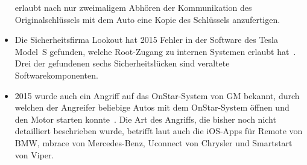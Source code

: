 \begin{itemize}
          erlaubt nach nur zweimaligem Abhören der Kommunikation des
          Originalschlüssels mit dem Auto eine Kopie des Schlüssels
          anzufertigen.
    \item Die Sicherheitsfirma Lookout hat 2015 Fehler in der Software des
          Tesla Model~S gefunden, welche Root-Zugang zu internen Systemen
          erlaubt hat~\cite{Mahaffey2015}. Drei der gefundenen sechs
          Sicherheitslücken sind veraltete Softwarekomponenten.
    \item 2015 wurde auch ein Angriff auf das OnStar-System von GM bekannt,
          durch welchen der Angreifer beliebige Autos mit dem OnStar-System
          öffnen und den Motor starten konnte~\cite{Stevens2015}. Die Art des
          Angriffs, die bisher noch nicht detailliert beschrieben wurde,
          betrifft laut \cite{Greenberg2015} auch die iOS-Apps für Remote von
          BMW, mbrace von Mercedes-Benz, Uconnect von Chrysler und Smartstart
          von Viper.
\end{itemize}
